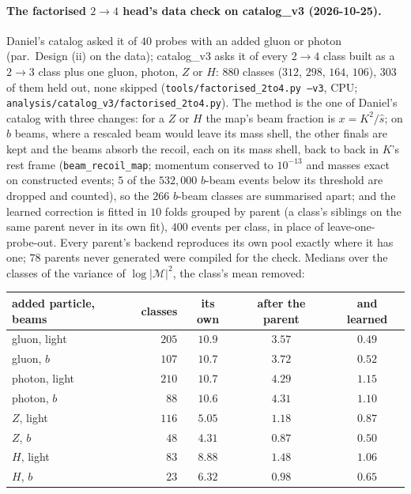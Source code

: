 \documentclass[11pt]{article}
\newcommand{\code}[1]{\texttt{#1}}
\begin{document}
\paragraph{The factorised $2\to4$ head's data check on catalog\_v3 (2026-10-25).} Daniel's catalog asked it of $40$
probes with an added gluon or photon (par.\ Design (ii) on the data); catalog\_v3 asks it of every $2\to4$ class built
as a $2\to3$ class plus one gluon, photon, $Z$ or $H$: $880$ classes ($312$, $298$, $164$, $106$), $303$ of them held
out, none skipped (\code{tools/factorised\_2to4.py --v3}, CPU; \code{analysis/catalog\_v3/factorised\_2to4.py}). The
method is the one of Daniel's catalog with three changes: for a $Z$ or $H$ the map's beam fraction is $x=K^2/\hat s$;
on $b$ beams, where a rescaled beam would leave its mass shell, the other finals are kept and the beams absorb the
recoil, each on its mass shell, back to back in $K$'s rest frame (\code{beam\_recoil\_map}; momentum conserved to
$10^{-13}$ and masses exact on constructed events; $5$ of the $532{,}000$ $b$-beam events below its threshold are
dropped and counted), so the $266$ $b$-beam classes are summarised apart; and the learned correction is fitted in $10$
folds grouped by parent (a class's siblings on the same parent never in its own fit), $400$ events per class, in place
of leave-one-probe-out. Every parent's backend reproduces its own pool exactly where it has one; $78$ parents never
generated were compiled for the check. Medians over the classes of the variance of $\log|\mathcal M|^2$, the class's
mean removed:
\begin{center}
\small
\begin{tabular}{lrccc}
\hline
added particle, beams & classes & its own & after the parent & and learned \\
\hline
gluon, light & $205$ & $10.9$ & $3.57$ & $0.49$ \\
gluon, $b$ & $107$ & $10.7$ & $3.72$ & $0.52$ \\
photon, light & $210$ & $10.7$ & $4.29$ & $1.15$ \\
photon, $b$ & $88$ & $10.6$ & $4.31$ & $1.10$ \\
$Z$, light & $116$ & $5.05$ & $1.18$ & $0.87$ \\
$Z$, $b$ & $48$ & $4.31$ & $0.87$ & $0.50$ \\
$H$, light & $83$ & $8.88$ & $1.48$ & $1.06$ \\
$H$, $b$ & $23$ & $6.32$ & $0.98$ & $0.65$ \\
\hline
\end{tabular}
\end{center}
\end{document}
